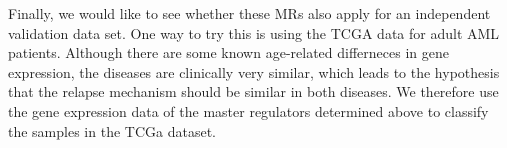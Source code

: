 \documentclass[10pt, letterpaper, twoside, english]{article}
\begin{document}
Finally, we would like to see whether these MRs also apply for an independent validation data set.
One way to try this is using the TCGA data for adult AML patients.
Although there are some known age-related differneces in gene expression,
the diseases are clinically very similar, 
which leads to the hypothesis that the relapse mechanism should be similar in both diseases.
We therefore use the gene expression data of the master regulators determined above to classify the 
samples in the TCGa dataset.

\end{document}
